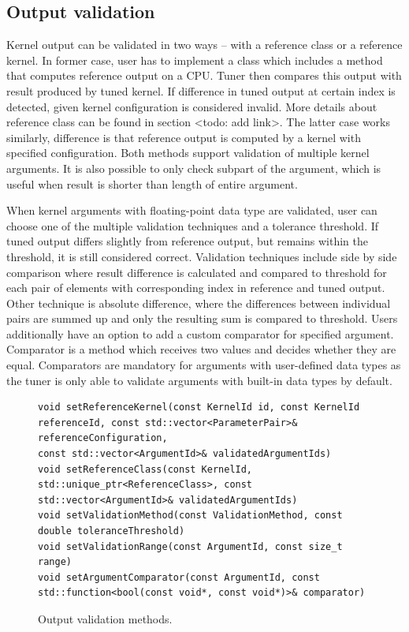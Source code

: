 \documentclass
[
    digital, %
    oneside, %
    table, %
    nolof, %
    nolot, %
    nocover %
]{fithesis3}
\begin{document}
\subsection{Output validation}
Kernel output can be validated in two ways -- with a reference class or a reference kernel. In former case, user has to implement a class which
includes a method that computes reference output on a CPU. Tuner then compares this output with result produced by tuned kernel. If difference in tuned
output at certain index is detected, given kernel configuration is considered invalid. More details about reference class can be found in section <todo: add link>.
The latter case works similarly, difference is that reference output is computed by a kernel with specified configuration. Both methods support
validation of multiple kernel arguments. It is also possible to only check subpart of the argument, which is useful when result is shorter than length
of entire argument.

When kernel arguments with floating-point data type are validated, user can choose one of the multiple validation techniques and a tolerance threshold.
If tuned output differs slightly from reference output, but remains within the threshold, it is still considered correct. Validation techniques include
side by side comparison where result difference is calculated and compared to threshold for each pair of elements with corresponding index in reference
and tuned output. Other technique is absolute difference, where the differences between individual pairs are summed up and only the resulting sum is
compared to threshold. Users additionally have an option to add a custom comparator for specified argument. Comparator is a method which receives two
values and decides whether they are equal. Comparators are mandatory for arguments with user-defined data types as the tuner is only able to validate
arguments with built-in data types by default.

\begin{figure}
\begin{lstlisting}
void setReferenceKernel(const KernelId id, const KernelId referenceId, const std::vector<ParameterPair>& referenceConfiguration,
const std::vector<ArgumentId>& validatedArgumentIds)
void setReferenceClass(const KernelId, std::unique_ptr<ReferenceClass>, const std::vector<ArgumentId>& validatedArgumentIds)
void setValidationMethod(const ValidationMethod, const double toleranceThreshold)
void setValidationRange(const ArgumentId, const size_t range)
void setArgumentComparator(const ArgumentId, const std::function<bool(const void*, const void*)>& comparator)
\end{lstlisting}
\caption{Output validation methods.}
\label{ktt-validation-methods}
\end{figure}
\end{document}

